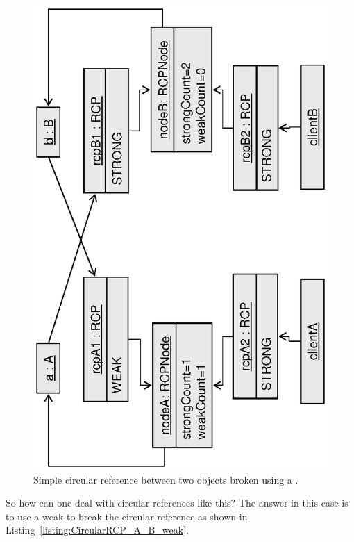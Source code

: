 \documentclass[pdf,ps2pdf,11pt]{SANDreport}
\begin{document}
{\bsinglespace
\begin{figure}
\begin{center}
\includegraphics*[angle=270,scale=0.65]{CircularRCP_A_B_weak}
\end{center}
\caption{
\label{fig:CircularRCP_A_B_weak}
Simple circular reference between two objects broken using a
{} {}.  }
\end{figure}
\esinglespace}

So how can one deal with circular references like this?  The answer in
this case is to use a weak {} to break the circular reference
as shown in Listing~\ref{listing:CircularRCP_A_B_weak}.
\end{document}
